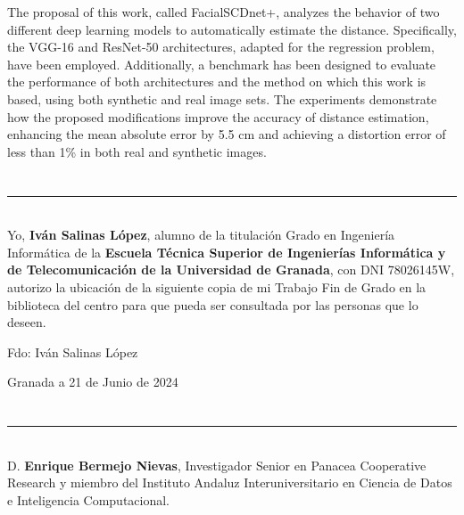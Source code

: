 The proposal of this work, called FacialSCDnet+, analyzes the behavior of two different deep learning models to automatically estimate the distance. Specifically, the VGG-16 and ResNet-50 architectures, adapted for the regression problem, have been employed. Additionally, a benchmark has been designed to evaluate the performance of both architectures and the method on which this work is based, using both synthetic and real image sets. The experiments demonstrate how the proposed modifications improve the accuracy of distance estimation, enhancing the mean absolute error by 5.5 cm and achieving a distortion error of less than 1\% in both real and synthetic images.

\chapter*{}
\thispagestyle{empty}

\noindent\rule[-1ex]{\textwidth}{2pt}\\[4.5ex]

Yo, \textbf{Iván Salinas López}, alumno de la titulación Grado en Ingeniería Informática de la \textbf{Escuela Técnica Superior de Ingenierías Informática y de Telecomunicación de la Universidad de Granada}, con DNI 78026145W, autorizo la ubicación de la siguiente copia de mi Trabajo Fin de Grado en la biblioteca del centro para que pueda ser consultada por las personas que lo deseen.

\vspace{6cm}

\noindent Fdo: Iván Salinas López

\vspace{2cm}

\begin{flushright}
Granada a 21 de Junio de 2024
\end{flushright}


\chapter*{}
\thispagestyle{empty}

\noindent\rule[-1ex]{\textwidth}{2pt}\\[4.5ex]

D. \textbf{Enrique Bermejo Nievas}, Investigador Senior en Panacea Cooperative Research y miembro del Instituto Andaluz Interuniversitario en Ciencia de Datos e Inteligencia Computacional.

\vspace{0.5cm}

